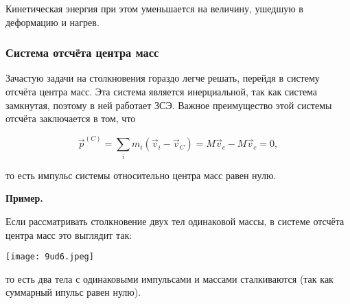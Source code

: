 \documentclass[12pt, a4paper]{article}%
\begin{document}
Кинетическая энергия при этом уменьшается на величину, ушедшую в деформацию и нагрев.


\subsubsection*{Система отсчёта центра масс}
Зачастую задачи на столкновения гораздо легче решать, перейдя в систему отсчёта центра масс. Эта система является инерциальной, так как система замкнутая, поэтому в ней работает ЗСЭ. Важное преимущество этой системы отсчёта заключается в том, что

\[
\vec p^{(C)} = \sum_im_i(\vec v_i - \vec v_C) = M\vec v_c-M\vec v_c = 0, 
\]

то есть импульс системы относительно центра масс равен нулю. 

\textbf{Пример.}

Если рассматривать столкновение двух тел одинаковой массы, в системе отсчёта центра масс это выглядит так:

\begin{center}
\texttt{[image: 9ud6.jpeg]}
\label{fig:mpr}
\end{center}

то есть два тела с одинаковыми импульсами и массами сталкиваются (так как суммарный ипульс равен нулю). 
\end{document}
